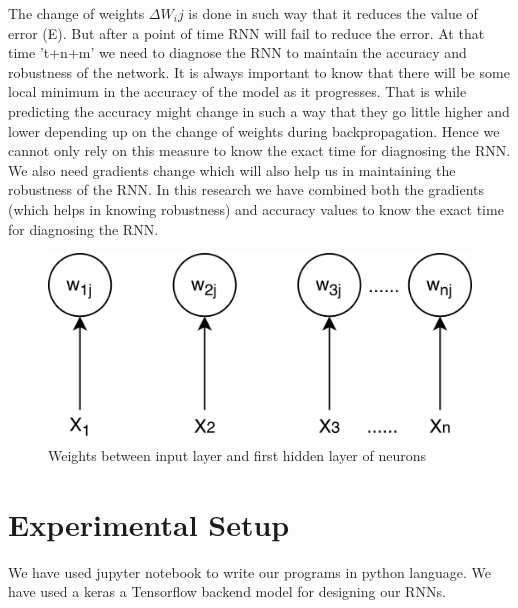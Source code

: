 \documentclass[sigconf,authordraft]{acmart}
\begin{document}
The change of weights $\Delta W_ij$ is done in such way that it reduces the value of error (E). But after a point of time RNN will fail to reduce the error. At that time 't+n+m' we need to diagnose the RNN to maintain the accuracy and robustness of the network. It is always important to know that there will be some local minimum in the accuracy of the model as it progresses. That is while predicting the accuracy might change in such a way that they go little higher and lower depending up on the change of weights during backpropagation. Hence we cannot only rely on this measure to know the exact time for diagnosing the RNN. We also need gradients change which will also help us in maintaining the robustness of the RNN. In this research we have combined both the gradients (which helps in knowing robustness) and accuracy values to know the exact time for diagnosing the RNN.  %



\begin{figure}
\includegraphics[width=\linewidth, scale = 0.5]{Weights_input_RNN.png}
\caption{Weights between input layer and first hidden layer of neurons} \label{fig:3}
\end{figure}



\section{Experimental Setup}

We have used jupyter notebook to write our programs in python language. We have used a keras a Tensorflow backend model for designing our RNNs. 
\end{document}
